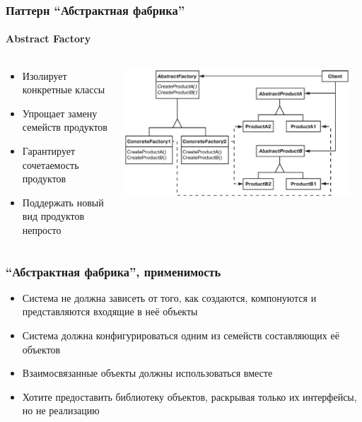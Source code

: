 \documentclass{../cscslides}
\begin{document}
    \begin{frame}
        \frametitle{Паттерн ``Абстрактная фабрика''}
        \framesubtitle{Abstract Factory}
        \begin{columns}
            \begin{column}{0.4\textwidth}
                \begin{itemize}
                    \item Изолирует конкретные классы
                    \item Упрощает замену семейств продуктов
                    \item Гарантирует сочетаемость продуктов
                    \item Поддержать новый вид продуктов непросто
                \end{itemize}
            \end{column}
            \begin{column}{0.6\textwidth}
                \begin{center}
                    \includegraphics[width=0.95\textwidth]{abstractFactory.png}
                \end{center}
            \end{column}
        \end{columns}
    \end{frame}

    \begin{frame}
        \frametitle{``Абстрактная фабрика'', применимость}
        \begin{itemize}
            \item Система не должна зависеть от того, как создаются, компонуются и представляются входящие в неё объекты
            \item Система должна конфигурироваться одним из семейств составляющих её объектов
            \item Взаимосвязанные объекты должны использоваться вместе
            \item Хотите предоставить библиотеку объектов, раскрывая только их интерфейсы, но не реализацию
        \end{itemize}
    \end{frame}
\end{document}
